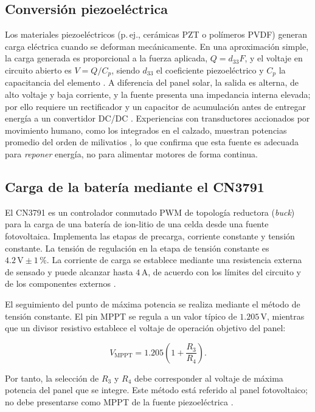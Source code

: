 \documentclass[11pt]{article}
\begin{document}
\subsection{Conversión piezoeléctrica}
Los materiales piezoeléctricos (p.\,ej., cerámicas PZT o polímeros PVDF)
generan carga eléctrica cuando se deforman mecánicamente. En una aproximación
simple, la carga generada es proporcional a la fuerza aplicada, $Q = d_{33}F$,
y el voltaje en circuito abierto es $V = Q/C_p$, siendo $d_{33}$ el coeficiente
piezoeléctrico y $C_p$ la capacitancia del elemento \cite{priya2007}. A
diferencia del panel solar, la salida es alterna, de alto voltaje y baja
corriente, y la fuente presenta una impedancia interna elevada; por ello
requiere un rectificador y un capacitor de acumulación antes de entregar
energía a un convertidor DC/DC \cite{ottman2002}. Experiencias con
transductores accionados por movimiento humano, como los integrados en el
calzado, muestran potencias promedio del orden de milivatios
\cite{shenck2001}, lo que confirma que esta fuente es adecuada para
\emph{reponer} energía, no para alimentar motores de forma continua.
 
\subsection{Carga de la batería mediante el CN3791}

El CN3791 es un controlador conmutado PWM de topología reductora (\textit{buck})
para la carga de una batería de ion-litio de una celda desde una fuente
fotovoltaica. Implementa las etapas de precarga, corriente constante y tensión
constante. La tensión de regulación en la etapa de tensión constante es
\(4.2\,\mathrm{V}\pm 1\,\%\). La corriente de carga se establece mediante una
resistencia externa de sensado y puede alcanzar hasta \(4\,\mathrm{A}\), de
acuerdo con los límites del circuito y de los componentes externos
\cite{consonance_cn3791,consonance_cn3791_datasheet}.

El seguimiento del punto de máxima potencia se realiza mediante el método de
tensión constante. El pin MPPT se regula a un valor típico de
\(1.205\,\mathrm{V}\), mientras que un divisor resistivo establece el voltaje
de operación objetivo del panel:

\begin{equation}
V_{\mathrm{MPPT}} =
1.205\left(1+\frac{R_3}{R_4}\right).
\end{equation}

Por tanto, la selección de \(R_3\) y \(R_4\) debe corresponder al voltaje de
máxima potencia del panel que se integre. Este método está referido al panel
fotovoltaico; no debe presentarse como MPPT de la fuente piezoeléctrica
\cite{consonance_cn3791_datasheet}.
\end{document}
